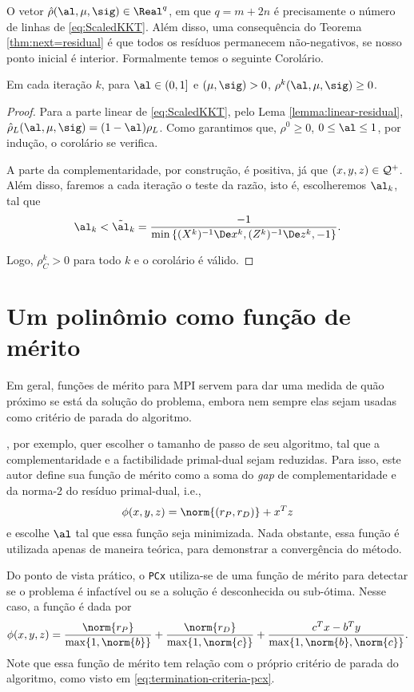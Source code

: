 O vetor  $\hat{\rho}(\al,\mu,\sig) \in \Real^q$, em que  $q = m+2n$ é
precisamente o número de linhas de  \eqref{eq:ScaledKKT}. Além disso, uma
consequência do Teorema \ref{thm:next=residual} é que todos os resíduos
permanecem não-negativos, se nosso ponto inicial é interior. Formalmente temos o seguinte Corolário. 

\begin{corol}\label{cor:positive-residual}
Em cada iteração $k$, para  $ \al \in(0,1]$ e  $(\mu, \sig)>0$,
$\rho^k(\al,\mu,\sig) \geq 0$.
\end{corol} 
\begin{proof}

Para a parte linear de  \eqref{eq:ScaledKKT}, pelo Lema
\ref{lemma:linear-residual}, $\hat{\rho}_L(\al,\mu,\sig) = (1-\al)\rho_L$. Como
garantimos que, $\rho^0\geq 0$, $0\leq\al\leq1 $, por  indução, o corolário
se verifica.

A parte da complementaridade, por construção,  é positiva, já que 
$(x,y,z)\in\mathcal{Q}^+$. Além disso, faremos a cada iteração o teste da razão, isto é, escolheremos $\alk $,
tal que 
\begin{equation}
	\label{eq:ratio-test}
\alk  < \tilde{\al}_k = \frac{-1}{\min\left\{
(X^k)^{-1}\Dex^k,(Z^k)^{-1}\Dez^k,-1 \right\}}. 
\end{equation}

Logo, $\rho^k_C>0$ para todo $k$ e o corolário é válido. 
\end{proof}

\section{Um polinômio como  função de mérito}


Em geral, funções de mérito para \ac{MPI} servem para dar uma medida de quão
próximo se está da solução do problema, embora nem sempre elas sejam usadas como
critério de parada do algoritmo. 

\textcite{Zhang:2006ic}, por exemplo, quer escolher o tamanho de passo de seu
algoritmo, tal que a  complementaridade e a factibilidade primal-dual sejam
reduzidas. Para isso, este autor define sua função de mérito como a soma do
\emph{gap} de complementaridade e da norma-2 do resíduo primal-dual, i.e., \[\phi(x,y,z) =
\norm{(r_P,r_D)} + x^Tz\] e escolhe $\al$ tal que essa função seja minimizada.
Nada obstante, essa função é utilizada apenas de maneira teórica, para
demonstrar a convergência do método.

Do ponto de vista prático, o  \texttt{PCx} \cite{Czyzyk:1999hk} utiliza-se de
uma função de mérito para detectar se o problema é infactível ou se a solução é desconhecida
ou sub-ótima. Nesse caso, a função é dada por 
\[
\phi(x,y,z) = \frac{\norm{r_P}}{\max \{1,\norm{b} \} } + \frac{\norm{r_D}}{\max
\{1,\norm{c} \} } + \frac{c^Tx - b^Ty}{\max \{1,\norm{b},\norm{c} \} }.
\]
Note que essa função de mérito tem relação com o próprio critério de parada
do algoritmo, como visto em  \eqref{eq:termination-criteria-pcx}.



